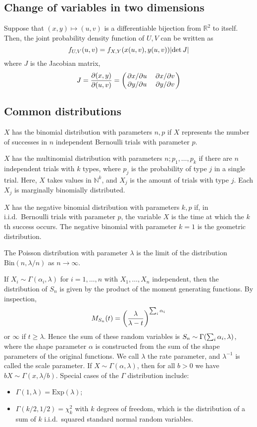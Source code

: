 \subsection{Change of variables in two dimensions}
Suppose that \( (x, y) \mapsto (u,v) \) is a differentiable bijection from \( \mathbb R^2 \) to itself.
Then, the joint probability density function of \( U,V \) can be written as
\[
	f_{U,V}(u,v) = f_{X,Y}(x(u,v), y(u,v)) \abs{\det J}
\]
where \( J \) is the Jacobian matrix,
\[
	J = \pdv{(x,y)}{(u,v)} = \begin{pmatrix}
		\pdv*{x}{u} & \pdv*{x}{v} \\
		\pdv*{y}{u} & \pdv*{y}{v}
	\end{pmatrix}
\]

\subsection{Common distributions}
\( X \) has the binomial distribution with parameters \( n, p \) if \( X \) represents the number of successes in \( n \) independent Bernoulli trials with parameter \( p \).

\( X \) has the multinomial distribution with parameters \( n; p_1, \dots, p_k \) if there are \( n \) independent trials with \( k \) types, where \( p_j \) is the probability of type \( j \) in a single trial.
Here, \( X \) takes values in \( \mathbb N^k \), and \( X_j \) is the amount of trials with type \( j \).
Each \( X_j \) is marginally binomially distributed.

\( X \) has the negative binomial distribution with parameters \( k, p \) if, in i.i.d.\ Bernoulli trials with parameter \( p \), the variable \( X \) is the time at which the \( k \)th success occurs.
The negative binomial with parameter \( k = 1 \) is the geometric distribution.

The Poisson distribution with parameter \( \lambda \) is the limit of the distribution \( \mathrm{Bin}(n, \lambda/n) \) as \( n \to \infty \).

If \( X_i \sim \Gamma(\alpha_i, \lambda) \) for \( i = 1, \dots, n \) with \( X_1, \dots, X_n \) independent, then the distribution of \( S_n \) is given by the product of the moment generating functions.
By inspection,
\[
	M_{S_n}(t) = \qty(\frac{\lambda}{\lambda - t})^{\sum_i \alpha_i}
\]
or \( \infty \) if \( t \geq \lambda \).
Hence the sum of these random variables is \( S_n \sim \Gamma\qty(\sum_{i} \alpha_i, \lambda) \), where the shape parameter \( \alpha \) is constructed from the sum of the shape parameters of the original functions.
We call \( \lambda \) the rate parameter, and \( \lambda^{-1} \) is called the scale parameter.
If \( X \sim \Gamma(\alpha, \lambda) \), then for all \( b > 0 \) we have \( bX \sim \Gamma(x, \lambda/b) \).
Special cases of the \( \Gamma \) distribution include:
\begin{itemize}
	\item \( \Gamma(1, \lambda) = \mathrm{Exp}(\lambda) \);
	\item \( \Gamma(k/2, 1/2) = \chi_k^2 \) with \( k \) degrees of freedom, which is the distribution of a sum of \( k \) i.i.d.\ squared standard normal random variables.
\end{itemize}
